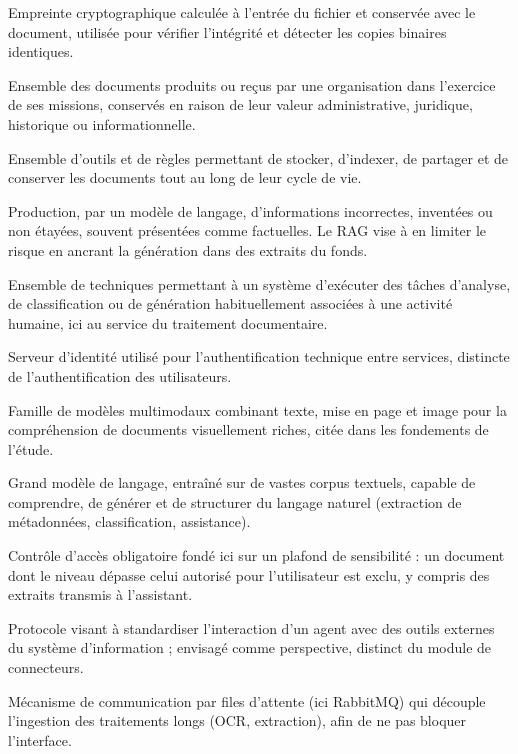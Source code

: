 \documentclass[12pt,a4paper]{report}
\begin{document}
\begin{description}[style=unboxed, leftmargin=0pt, itemsep=0.55em, parsep=0.12em, font=\normalfont\bfseries]
  \item[empreinte SHA-256] Empreinte cryptographique calculée à l'entrée du fichier et conservée avec le document, utilisée pour vérifier l'intégrité et détecter les copies binaires identiques.
  \item[fonds documentaire] Ensemble des documents produits ou reçus par une organisation dans l'exercice de ses missions, conservés en raison de leur valeur administrative, juridique, historique ou informationnelle.
  \item[GED (Gestion électronique des documents)] Ensemble d'outils et de règles permettant de stocker, d'indexer, de partager et de conserver les documents tout au long de leur cycle de vie.
  \item[hallucination] Production, par un modèle de langage, d'informations incorrectes, inventées ou non étayées, souvent présentées comme factuelles. Le RAG vise à en limiter le risque en ancrant la génération dans des extraits du fonds.
  \item[IA (intelligence artificielle)] Ensemble de techniques permettant à un système d'exécuter des tâches d'analyse, de classification ou de génération habituellement associées à une activité humaine, ici au service du traitement documentaire.
  \item[Keycloak] Serveur d'identité utilisé pour l'authentification technique entre services, distincte de l'authentification des utilisateurs.
  \item[LayoutLM] Famille de modèles multimodaux combinant texte, mise en page et image pour la compréhension de documents visuellement riches, citée dans les fondements de l'étude.
  \item[LLM (\textit{Large Language Model})] Grand modèle de langage, entraîné sur de vastes corpus textuels, capable de comprendre, de générer et de structurer du langage naturel (extraction de métadonnées, classification, assistance).
  \item[MAC (\textit{Mandatory Access Control})] Contrôle d'accès obligatoire fondé ici sur un plafond de sensibilité : un document dont le niveau dépasse celui autorisé pour l'utilisateur est exclu, y compris des extraits transmis à l'assistant.
  \item[MCP (\textit{Model Context Protocol})] Protocole visant à standardiser l'interaction d'un agent avec des outils externes du système d'information ; envisagé comme perspective, distinct du module de connecteurs.
  \item[messagerie asynchrone] Mécanisme de communication par files d'attente (ici RabbitMQ) qui découple l'ingestion des traitements longs (OCR, extraction), afin de ne pas bloquer l'interface.

\end{description}
\end{document}
